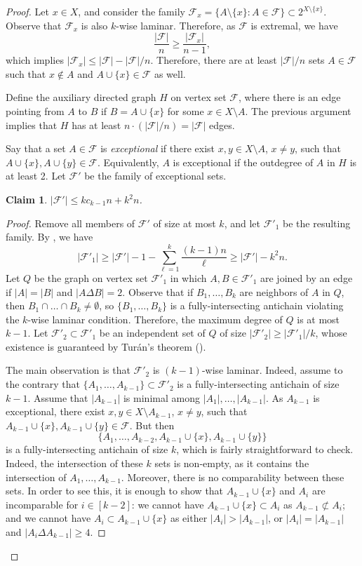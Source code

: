 \documentclass[11pt]{article}
\newtheorem{claim}[claim]{Claim}
\theoremstyle{definition}
\newcommand{\cF}{\mathcal{F}}
\begin{document}
\begin{proof}
Let $x\in X$, and consider the family $\cF_x=\{A\setminus \{x\}:A\in \cF\}\subset 2^{X\setminus\{x\}}$. Observe that $\cF_x$ is also $k$-wise laminar. Therefore, as $\cF$ is extremal, we have
$$\frac{|\cF|}{n}\geq \frac{|\cF_x|}{n-1},$$
which implies $|\cF_x|\leq |\cF|-|\cF|/n$. Therefore, there are at least $|\cF|/n$ sets $A\in \cF$ such that $x\not\in A$ and $A\cup\{x\}\in \cF$ as well.

Define the auxiliary directed graph $H$ on vertex set $\cF$, where there is an edge pointing from $A$ to $B$ if $B=A\cup\{x\}$ for some $x\in X\setminus A$. The previous argument implies that $H$ has at least $n\cdot (|\cF|/n)=|\cF|$ edges.


Say that a set $A\in \cF$ is \emph{exceptional} if there exist $x,y\in X\setminus A$, $x\neq y$, such that $A\cup\{x\},A\cup\{y\}\in \cF$. Equivalently, $A$ is exceptional if the outdegree of $A$ in $H$ is at least 2. Let $\cF'$ be the family of exceptional sets. 
\begin{claim}
    $|\cF'|\leq kc_{k-1}n+k^2n$.
\end{claim}

\begin{proof}
Remove all members of $\cF'$ of size at most $k$, and let $\cF'_1$ be the resulting family. By , we have 
$$|\cF'_1|\geq |\cF'|-1-\sum_{\ell=1}^k\frac{(k-1)n}{\ell}\geq |\cF'|-k^2n.$$ Let $Q$ be the graph on vertex set $\cF'_1$ in which $A,B\in \cF'_1$ are joined by an edge if $|A|=|B|$ and $|A\Delta B|=2$. Observe that if $B_1,\dots,B_k$ are neighbors of $A$ in $Q$, then $B_1\cap\dots\cap B_k\neq \emptyset$, so $\{B_1,\dots,B_k\}$ is a fully-intersecting antichain violating the $k$-wise laminar condition. Therefore, the maximum degree of $Q$ is at most $k-1$. Let $\cF'_2\subset \cF'_1$ be an independent set of $Q$ of size $|\cF'_2|\geq |\cF'_1|/k$, whose existence is guaranteed by Tur\'an's theorem ().

The main observation is that $\cF'_2$ is $(k-1)$-wise laminar. Indeed, assume to the contrary that $\{A_1,\dots,A_{k-1}\}\subset \cF'_2$ is a fully-intersecting antichain of size $k-1$. Assume that $|A_{k-1}|$ is minimal among $|A_1|,\dots,|A_{k-1}|$.  As $A_{k-1}$ is exceptional, there exist $x,y\in X\setminus A_{k-1}$, $x\neq y$, such that $A_{k-1}\cup\{x\},A_{k-1}\cup\{y\}\in \cF$. But then $$\{A_1,\dots,A_{k-2},A_{k-1}\cup\{x\},A_{k-1}\cup\{y\}\}$$ is a fully-intersecting antichain of size $k$, which  is fairly straightforward to check. Indeed, the intersection of these $k$ sets is non-empty, as it contains the intersection of $A_1,\dots,A_{k-1}.$  Moreover, there is no comparability between these sets. In order to see this, it is enough to show that $A_{k-1}\cup\{x\}$ and $A_i$ are incomparable for $i\in [k-2]$: we cannot have $A_{k-1}\cup\{x\}\subset A_i$ as $A_{k-1}\not\subset A_i$; and we cannot have $A_{i}\subset A_{k-1}\cup\{x\}$ as either $|A_i|>|A_{k-1}|$, or $|A_i|=|A_{k-1}|$ and $|A_i\Delta A_{k-1}|\geq 4$. 


\end{proof}
\end{proof}
\end{document}
